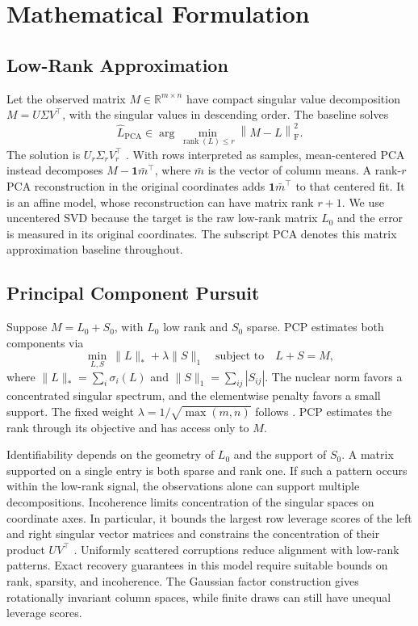 \documentclass[conference]{IEEEtran}
\newcommand{\fro}[1]{\left\|#1\right\|_{\mathrm F}}
\begin{document}
\section{Mathematical Formulation}
\subsection{Low-Rank Approximation}
Let the observed matrix $M\in\mathbb R^{m\times n}$ have compact singular value decomposition $M=U\Sigma V^\top$, with the singular values in descending order. The baseline solves
\begin{equation}
  \hat L_{\mathrm{PCA}}
    \in\arg\min_{\operatorname{rank}(L)\le r}\fro{M-L}^2.
  \label{eq:svd_objective}
\end{equation}
The solution is $U_r\Sigma_r V_r^\top$ \cite{eckart1936}. With rows interpreted as samples, mean-centered PCA instead decomposes $M-\mathbf{1}\bar m^\top$, where $\bar m$ is the vector of column means. A rank-$r$ PCA reconstruction in the original coordinates adds $\mathbf{1}\bar m^\top$ to that centered fit. It is an affine model, whose reconstruction can have matrix rank $r+1$. We use uncentered SVD because the target is the raw low-rank matrix $L_0$ and the error is measured in its original coordinates. The subscript PCA denotes this matrix approximation baseline throughout.

\subsection{Principal Component Pursuit}
Suppose $M=L_0+S_0$, with $L_0$ low rank and $S_0$ sparse. PCP estimates both components via
\begin{equation}
  \min_{L,S}\ \|L\|_*+\lambda\|S\|_1
  \quad\text{subject to}\quad L+S=M,
  \label{eq:pcp}
\end{equation}
where $\|L\|_*=\sum_i \sigma_i(L)$ and $\|S\|_1=\sum_{ij}|S_{ij}|$. The nuclear norm favors a concentrated singular spectrum, and the elementwise penalty favors a small support. The fixed weight $\lambda=1/\sqrt{\max(m,n)}$ follows \cite{candes2011}. PCP estimates the rank through its objective and has access only to $M$.

Identifiability depends on the geometry of $L_0$ and the support of $S_0$. A matrix supported on a single entry is both sparse and rank one. If such a pattern occurs within the low-rank signal, the observations alone can support multiple decompositions. Incoherence limits concentration of the singular spaces on coordinate axes. In particular, it bounds the largest row leverage scores of the left and right singular vector matrices and constrains the concentration of their product $UV^\top$ \cite{candes2011}. Uniformly scattered corruptions reduce alignment with low-rank patterns. Exact recovery guarantees in this model require suitable bounds on rank, sparsity, and incoherence. The Gaussian factor construction gives rotationally invariant column spaces, while finite draws can still have unequal leverage scores.
\end{document}
